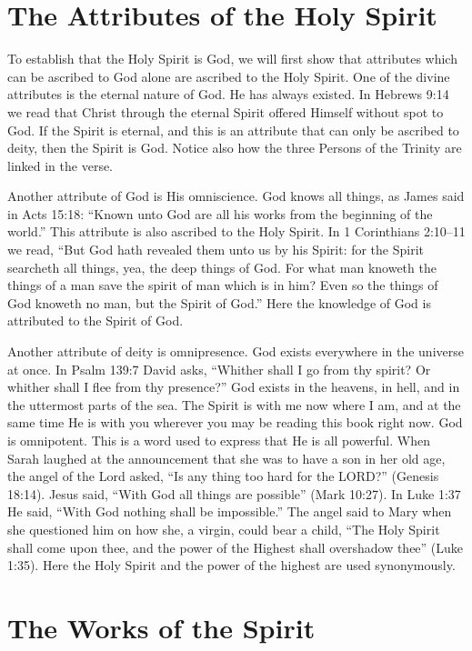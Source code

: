\section*{The Attributes of the Holy Spirit}

To establish that the Holy Spirit is God, we will first
show that attributes which can be ascribed to God alone
are ascribed to the Holy Spirit. One of the divine attributes
is the eternal nature of God. He has always existed. In
Hebrews 9:14 we read that Christ through the eternal Spirit
offered Himself without spot to God. If the Spirit is eternal,
and this is an attribute that can only be ascribed to deity,
then the Spirit is God. Notice also how the three Persons of
the Trinity are linked in the verse.

Another attribute of God is His omniscience. God knows
all things, as James said in Acts 15:18: “Known unto God
are all his works from the beginning of the world.” This
attribute is also ascribed to the Holy Spirit. In 1 Corinthians
2:10–11 we read, “But God hath revealed them unto us by
his Spirit: for the Spirit searcheth all things, yea, the deep
things of God. For what man knoweth the things of a man
save the spirit of man which is in him? Even so the things
of God knoweth no man, but the Spirit of God.” Here the
knowledge of God is attributed to the Spirit of God.

Another attribute of deity is omnipresence. God exists
everywhere in the universe at once. In Psalm 139:7 David
asks, “Whither shall I go from thy spirit? Or whither shall I
flee from thy presence?” God exists in the heavens, in hell,
and in the uttermost parts of the sea. The Spirit is with me
now where I am, and at the same time He is with you wherever
you may be reading this book right now. God is omnipotent.
This is a word used to express that He is all powerful.
When Sarah laughed at the announcement that she was to
have a son in her old age, the angel of the Lord asked, “Is
any thing too hard for the LORD?” (Genesis 18:14). Jesus said,
“With God all things are possible” (Mark 10:27). In Luke
1:37 He said, “With God nothing shall be impossible.” The
angel said to Mary when she questioned him on how she, a
virgin, could bear a child, “The Holy Spirit shall come upon
thee, and the power of the Highest shall overshadow thee”
(Luke 1:35). Here the Holy Spirit and the power of the highest
are used synonymously.


\section*{The Works of the Spirit}

